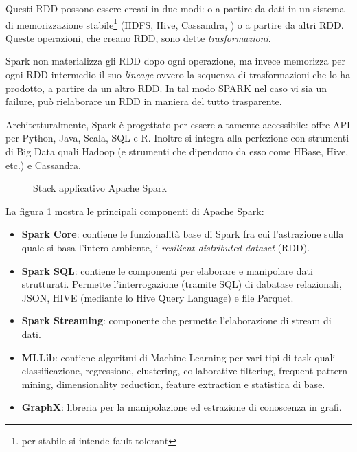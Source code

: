 Questi RDD possono essere creati in due modi: o a partire da dati in un sistema di memorizzazione stabile\footnote{per stabile si intende fault-tolerant} (HDFS, Hive, Cassandra, ) o a partire da altri RDD. Queste operazioni, che creano RDD, sono dette \emph{trasformazioni}.

Spark non materializza gli RDD dopo ogni operazione, ma invece memorizza per ogni RDD intermedio il suo \emph{lineage} ovvero la sequenza di trasformazioni che lo ha prodotto, a partire da un altro RDD. In tal modo SPARK nel caso vi sia un failure, può rielaborare un RDD in maniera del tutto trasparente.
 
Architetturalmente, Spark è progettato per essere altamente accessibile: offre API per Python, Java, Scala, SQL e R. Inoltre si integra alla perfezione con strumenti di Big Data quali Hadoop (e strumenti che dipendono da esso come HBase, Hive, etc.) e Cassandra.




 
\begin{figure}[htbp]
    \caption{Stack applicativo Apache Spark}
    \label{fig:sparkstack}
\end{figure}




La figura \ref{fig:sparkstack} mostra le principali componenti di Apache Spark:
\begin{itemize}
\item \textbf{Spark Core}: contiene le funzionalità base di Spark fra cui l'astrazione sulla quale si basa l'intero ambiente, i \textit{resilient distributed dataset} (RDD).
\item \textbf{Spark SQL}: contiene le componenti per elaborare e manipolare dati strutturati. Permette l'interrogazione (tramite SQL) di dabatase relazionali, JSON, HIVE (mediante lo Hive Query Language) e file Parquet. 
\item \textbf{Spark Streaming}: componente che permette l'elaborazione di stream di dati.
\item \textbf{MLLib}: contiene algoritmi di Machine Learning per vari tipi di task quali classificazione, regressione, clustering, collaborative filtering, frequent pattern mining, dimensionality reduction, feature extraction e statistica di base.
\item \textbf{GraphX}: libreria per la manipolazione ed estrazione di conoscenza in grafi.
\end{itemize}

